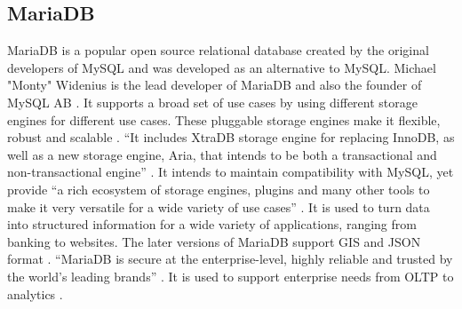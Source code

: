 \subsection{MariaDB}
 
MariaDB is a popular open source relational database created by the
original developers of MySQL and was developed as an alternative to
MySQL. Michael "Monty" Widenius is the lead developer of MariaDB and
also the founder of MySQL AB \cite{wiki-MariaDB}. It supports a broad
set of use cases by using different storage engines for different use
cases. These pluggable storage engines make it flexible, robust and
scalable \cite{mariadb-server}. “It includes XtraDB storage engine for
replacing InnoDB, as well as a new storage engine, Aria, that intends
to be both a transactional and non-transactional engine”
\cite{wiki-MariaDB}. It intends to maintain compatibility with
MySQL\cite{wiki-MariaDB}, yet provide “a rich ecosystem of storage
engines, plugins and many other tools to make it very versatile for a
wide variety of use cases” \cite{www-mariadb-org}. It is used to turn
data into structured information for a wide variety of applications,
ranging from banking to websites. The later versions of MariaDB
support GIS and JSON format \cite{www-mariabdb-org}. “MariaDB is
secure at the enterprise-level, highly reliable and trusted by the
world’s leading brands” \cite{about-mariadb}. It is used to support
enterprise needs from OLTP to analytics \cite{about-mariadb}.
 

